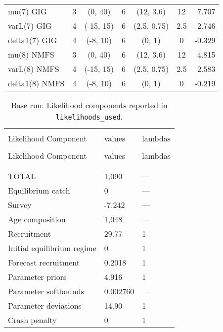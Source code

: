 \begin{table}[!h]
\begin{tabular}{lcccccr}
mu(7) GIG & 3 & (0, 40) & 6 & (12, 3.6) & 12 & 7.707 \\
varL(7) GIG & 4 & (-15, 15) & 6 & (2.5, 0.75) & 2.5 & 2.746 \\
delta1(7) GIG & 4 & (-8, 10) & 6 & (0, 1) & 0 & -0.329 \\
mu(8) NMFS & 3 & (0, 40) & 6 & (12, 3.6) & 12 & 4.815 \\
varL(8) NMFS & 4 & (-15, 15) & 6 & (2.5, 0.75) & 2.5 & 2.583 \\
delta1(8) NMFS & 4 & (-8, 10) & 6 & (0, 1) & 0 & -0.219 \\
\hline
\end{tabular}
\usefont{\encodingdefault}{\familydefault}{\seriesdefault}{\shapedefault}\normalsize
\end{table}

\clearpage

\setlength{\tabcolsep}{0pt}
\begin{longtable}[c]{>{\raggedright\let\newline\\\arraybackslash\hspace{0pt}}p{2.31in}>{\raggedleft\let\newline\\\arraybackslash\hspace{0pt}}p{1.35in}>{\raggedleft\let\newline\\\arraybackslash\hspace{0pt}}p{1.35in}}
  \caption{Base run: Likelihood components reported in \texttt{likelihoods\_used}.} \label{tab:pop.like1}\\  \hline\\[-2.2ex]  
  Likelihood Component  & values & lambdas \\[0.2ex]\hline\\[-1.5ex]  \endfirsthead   \hline  
  Likelihood Component  & values & lambdas \\[0.2ex]\hline\\[-1.5ex]  \endhead  \hline\\[-2.2ex]   \endfoot  \hline \endlastfoot
  TOTAL & 1,090 & --- \\ 
  Equilibrium catch & 0 & --- \\ 
  Survey & -7.242 & --- \\ 
  Age composition & 1,048 & --- \\ 
  Recruitment & 29.77 & 1 \\ 
  Initial equilibrium regime & 0 & 1 \\ 
  Forecast recruitment & 0.2018 & 1 \\ 
  Parameter priors & 4.916 & 1 \\ 
  Parameter softbounds & 0.002760 & --- \\ 
  Parameter deviations & 14.90 & 1 \\ 
  Crash penalty & 0 & 1 \\ 
\end{longtable}\setlength{\tabcolsep}{0pt}

